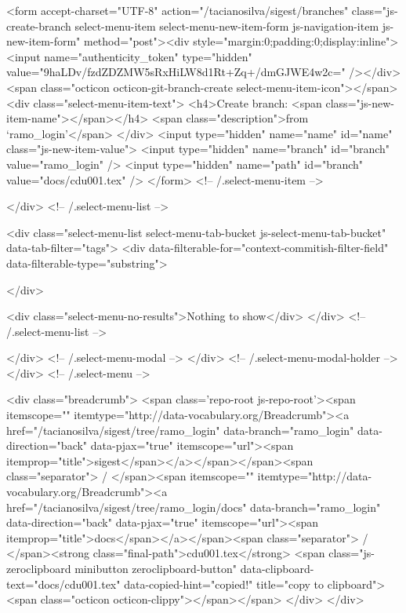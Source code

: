           <form accept-charset="UTF-8" action="/tacianosilva/sigest/branches" class="js-create-branch select-menu-item select-menu-new-item-form js-navigation-item js-new-item-form" method="post"><div style="margin:0;padding:0;display:inline"><input name="authenticity_token" type="hidden" value="9haLDv/fzdZDZMW5sRxHiLW8d1Rt+Zq+/dmGJWE4w2c=" /></div>
            <span class="octicon octicon-git-branch-create select-menu-item-icon"></span>
            <div class="select-menu-item-text">
              <h4>Create branch: <span class="js-new-item-name"></span></h4>
              <span class="description">from ‘ramo_login’</span>
            </div>
            <input type="hidden" name="name" id="name" class="js-new-item-value">
            <input type="hidden" name="branch" id="branch" value="ramo_login" />
            <input type="hidden" name="path" id="branch" value="docs/cdu001.tex" />
          </form> <!-- /.select-menu-item -->

      </div> <!-- /.select-menu-list -->

      <div class="select-menu-list select-menu-tab-bucket js-select-menu-tab-bucket" data-tab-filter="tags">
        <div data-filterable-for="context-commitish-filter-field" data-filterable-type="substring">


        </div>

        <div class="select-menu-no-results">Nothing to show</div>
      </div> <!-- /.select-menu-list -->

    </div> <!-- /.select-menu-modal -->
  </div> <!-- /.select-menu-modal-holder -->
</div> <!-- /.select-menu -->

  <div class="breadcrumb">
    <span class='repo-root js-repo-root'><span itemscope="" itemtype="http://data-vocabulary.org/Breadcrumb"><a href="/tacianosilva/sigest/tree/ramo_login" data-branch="ramo_login" data-direction="back" data-pjax="true" itemscope="url"><span itemprop="title">sigest</span></a></span></span><span class="separator"> / </span><span itemscope="" itemtype="http://data-vocabulary.org/Breadcrumb"><a href="/tacianosilva/sigest/tree/ramo_login/docs" data-branch="ramo_login" data-direction="back" data-pjax="true" itemscope="url"><span itemprop="title">docs</span></a></span><span class="separator"> / </span><strong class="final-path">cdu001.tex</strong> <span class="js-zeroclipboard minibutton zeroclipboard-button" data-clipboard-text="docs/cdu001.tex" data-copied-hint="copied!" title="copy to clipboard"><span class="octicon octicon-clippy"></span></span>
  </div>
</div>


